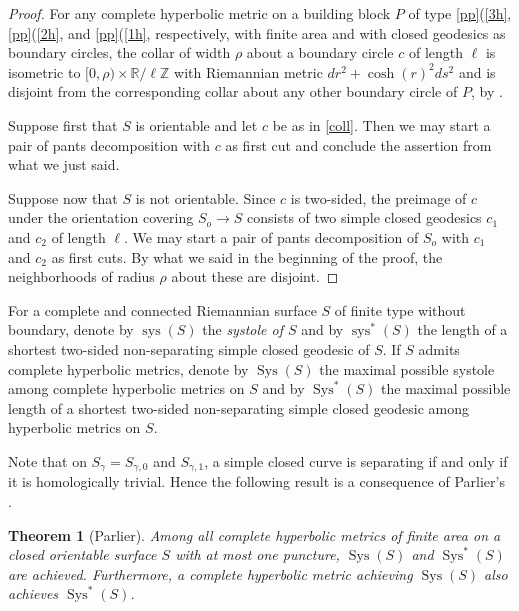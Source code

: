\documentclass[a4paper,11pt]{amsart}
\numberwithin{equation}{section}
\newtheorem{thm}[equation]{Theorem}
\theoremstyle{definition}
\def\R{\mathbb R}
\def\Z{\mathbb Z}
\DeclareMathOperator{\sys}{sys}
\DeclareMathOperator{\Sys}{Sys}
\begin{document}
\begin{proof}
For any complete hyperbolic metric on a building block $P$ of type \ref{pp}(\ref{3h}, \ref{pp}(\ref{2h}, and \ref{pp}(\ref{1h}, respectively, with finite area and with closed geodesics as boundary circles, the collar of width $\rho$ about a boundary circle $c$ of length $\ell$ is isometric to $[0,\rho)\times\R/\ell\Z$ with Riemannian metric $dr^2+\cosh(r)^2ds^2$ and is disjoint from the corresponding collar about any other boundary circle of $P$, by \cite[Propositions 3.1.8 and 4.4.4]{Bu2}.

Suppose first that $S$ is orientable and let $c$ be as in \cref{coll}.
Then we may start a pair of pants decomposition with $c$ as first cut and conclude the assertion from what we just said.

Suppose now that $S$ is not orientable.
Since $c$ is two-sided, the preimage of $c$ under the orientation covering $S_o\to S$ consists of two simple closed geodesics $c_1$ and $c_2$ of length $\ell$.
We may start a pair of pants decomposition of $S_o$ with $c_1$ and $c_2$ as first cuts.
By what we said in the beginning of the proof, the neighborhoods of radius $\rho$ about these are disjoint.
\end{proof}

For a complete and connected Riemannian surface $S$ of finite type without boundary, denote by $\sys(S)$ the \emph{systole of $S$} and by $\sys^*(S)$ the length of a shortest two-sided non-separating simple closed geodesic of $S$.
If $S$ admits complete hyperbolic metrics, denote by $\Sys(S)$ the maximal possible systole among complete hyperbolic metrics on $S$ and by $\Sys^*(S)$ the maximal possible length of a shortest two-sided non-separating simple closed geodesic among hyperbolic metrics on $S$.

Note that on $S_\gamma=S_{\gamma,0}$ and $S_{\gamma,1}$, a simple closed curve is separating if and only if it is homologically trivial.
Hence the following result is a consequence of Parlier's \cite[Theorem 1.1]{Pa}.

\begin{thm}[Parlier]\label{parl}
Among all complete hyperbolic metrics of finite area on a closed orientable surface $S$ with at most one puncture, $\Sys(S)$ and $\Sys^*(S)$ are achieved.
Furthermore, a complete hyperbolic metric achieving $\Sys(S)$ also achieves $\Sys^*(S)$.\end{thm}

\end{document}
